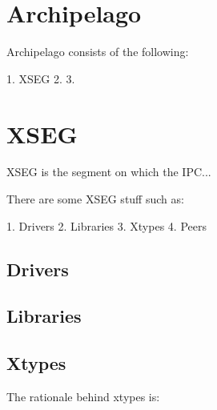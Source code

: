 \section{Archipelago}

Archipelago consists of the following:

1. XSEG
2.
3.

\section{XSEG}

XSEG is the segment on which the IPC...

There are some XSEG stuff such as:

1. Drivers
2. Libraries
3. Xtypes
4. Peers

\subsection{Drivers}

\subsection{Libraries}

\subsection{Xtypes}\label{sec:arch-xtypes}

The rationale behind xtypes is:

